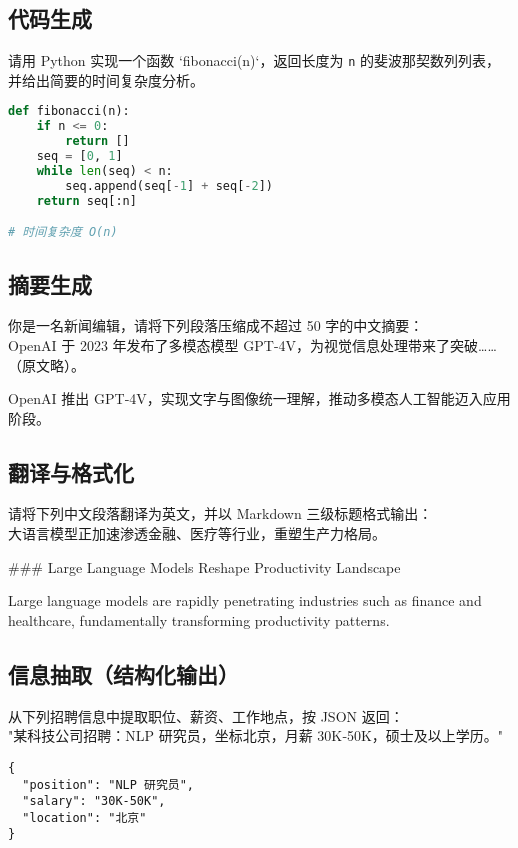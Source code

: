 \documentclass[12pt]{ctexart}
\begin{document}
\subsection{代码生成}
\begin{promptbox}
请用 Python 实现一个函数 `fibonacci(n)`，返回长度为 \texttt{n} 的斐波那契数列列表，并给出简要的时间复杂度分析。
\end{promptbox}
\begin{outputbox}
\begin{lstlisting}[language=Python]
def fibonacci(n):
    if n <= 0:
        return []
    seq = [0, 1]
    while len(seq) < n:
        seq.append(seq[-1] + seq[-2])
    return seq[:n]

# 时间复杂度 O(n)
\end{lstlisting}
\end{outputbox}

\subsection{摘要生成}
\begin{promptbox}
你是一名新闻编辑，请将下列段落压缩成不超过 50 字的中文摘要：\\
\smallskip
OpenAI 于 2023 年发布了多模态模型 GPT-4V，为视觉信息处理带来了突破……（原文略）。
\end{promptbox}
\begin{outputbox}
OpenAI 推出 GPT‑4V，实现文字与图像统一理解，推动多模态人工智能迈入应用阶段。
\end{outputbox}

\subsection{翻译与格式化}
\begin{promptbox}
请将下列中文段落翻译为英文，并以 Markdown 三级标题格式输出：\\
大语言模型正加速渗透金融、医疗等行业，重塑生产力格局。
\end{promptbox}
\begin{outputbox}
\#\#\# Large Language Models Reshape Productivity Landscape

Large language models are rapidly penetrating industries such as finance and healthcare, fundamentally transforming productivity patterns.
\end{outputbox}

\subsection{信息抽取（结构化输出）}
\begin{promptbox}
从下列招聘信息中提取职位、薪资、工作地点，按 JSON 返回：\\
"某科技公司招聘：NLP 研究员，坐标北京，月薪 30K‑50K，硕士及以上学历。"
\end{promptbox}
\begin{outputbox}
\begin{lstlisting}
{
  "position": "NLP 研究员",
  "salary": "30K-50K",
  "location": "北京"
}
\end{lstlisting}
\end{outputbox}
\end{document}

